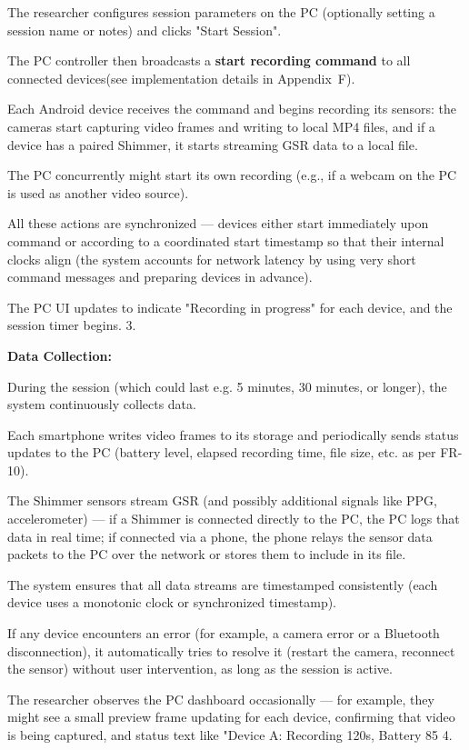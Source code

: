 The researcher configures session parameters on the PC (optionally setting a
session name or notes) and clicks "Start Session".

The PC controller then broadcasts a \textbf{start recording command}
 to all connected devices(see implementation details in Appendix~F).

Each Android device receives the command and begins recording its sensors: the
cameras start capturing video frames and writing to local MP4 files, and if a
device has a paired Shimmer, it starts streaming GSR data to a local file.

The PC concurrently might start its own recording (e.g., if a webcam on the PC
is used as another video source).

All these actions are synchronized --- devices either start immediately upon
command or according to a coordinated start timestamp so that their internal
clocks align (the system accounts for network latency by using very short
command messages and preparing devices in advance).

The PC UI updates to indicate "Recording in progress" for each device, and the
session timer begins. 3.

\textbf{Data Collection:}

During the session (which could last e.g. 5 minutes, 30 minutes, or longer), the
system continuously collects data.

Each smartphone writes video frames to its storage and periodically sends status
updates to the PC (battery level, elapsed recording time, file size, etc. as per
FR-10).

The Shimmer sensors stream GSR (and possibly additional signals like PPG,
accelerometer) --- if a Shimmer is connected directly to the PC, the PC logs
that data in real time; if connected via a phone, the phone relays the sensor
data packets to the PC over the network or stores them to include in its file.

The system ensures that all data streams are timestamped consistently (each
device uses a monotonic clock or synchronized timestamp).

If any device encounters an error (for example, a camera error or a Bluetooth
disconnection), it automatically tries to resolve it (restart the camera,
reconnect the sensor) without user intervention, as long as the session is
active.

The researcher observes the PC dashboard occasionally --- for example, they
might see a small preview frame updating for each device, confirming that video
is being captured, and status text like "Device A: Recording 120s, Battery 85%
4.

